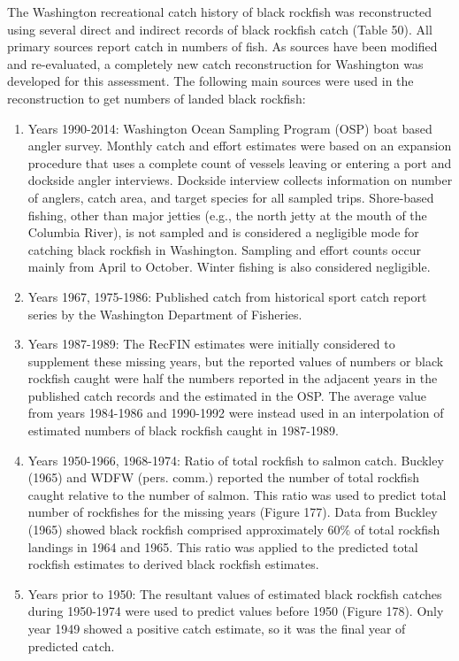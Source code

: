 \documentclass[11pt,
  english,
  letterpaper,
]{article}
\providecommand{\tightlist}{%
  \setlength{\itemsep}{0pt}\setlength{\parskip}{0pt}}
\providecommand{\tightlist}{%
  \setlength{\itemsep}{0pt}\setlength{\parskip}{0pt}}
\begin{document}
The Washington recreational catch history of black rockfish was reconstructed using several direct and indirect records of black rockfish catch (Table 50). All primary sources report catch in numbers of fish. As sources have been modified and re-evaluated, a completely new catch reconstruction for Washington was developed for this assessment. The following main sources were used in the reconstruction to get numbers of landed black rockfish:

\begin{enumerate}
\def\labelenumi{\arabic{enumi}.}
\tightlist
\item
  Years 1990-2014: Washington Ocean Sampling Program (OSP) boat based angler survey. Monthly catch and effort estimates were based on an expansion procedure that uses a complete count of vessels leaving or entering a port and dockside angler interviews. Dockside interview collects information on number of anglers, catch area, and target species for all sampled trips. Shore-based fishing, other than major jetties (e.g., the north jetty at the mouth of the Columbia River), is not sampled and is considered a negligible mode for catching black rockfish in Washington. Sampling and effort counts occur mainly from April to October. Winter fishing is also considered negligible.
\item
  Years 1967, 1975-1986: Published catch from historical sport catch report series by the Washington Department of Fisheries.
\item
  Years 1987-1989: The RecFIN estimates were initially considered to supplement these missing years, but the reported values of numbers or black rockfish caught were half the numbers reported in the adjacent years in the published catch records and the estimated in the OSP. The average value from years 1984-1986 and 1990-1992 were instead used in an interpolation of estimated numbers of black rockfish caught in 1987-1989.
\item
  Years 1950-1966, 1968-1974: Ratio of total rockfish to salmon catch. Buckley (1965) and WDFW (pers. comm.) reported the number of total rockfish caught relative to the number of salmon. This ratio was used to predict total number of rockfishes for the missing years (Figure 177). Data from Buckley (1965) showed black rockfish comprised approximately 60\% of total rockfish landings in 1964 and 1965. This ratio was applied to the predicted total rockfish estimates to derived black rockfish estimates.
\item
  Years prior to 1950: The resultant values of estimated black rockfish catches during 1950-1974 were used to predict values before 1950 (Figure 178). Only year 1949 showed a positive catch estimate, so it was the final year of predicted catch.
\end{enumerate}
\end{document}
